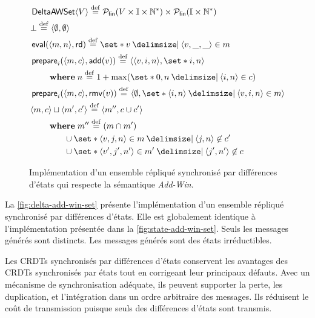 \begin{figure}[tb]
\centering
\begin{align*}
&\trm{DeltaAWSet}\tuple*{V} \defeq \powerfset{V \times \mathbb{I} \times \mathbb{N}^*} \times \powerfset{\mathbb{I} \times \mathbb{N}^*}\\
&\bot \defeq \tuple*{\emptyset, \emptyset}\\
&\trm{eval}(\tuple*{m, n}, \trm{rd}) \defeq \set*{v \given \tuple*{v, \_, \_} \in m}\\
&\begin{aligned}
\MoveEqLeft\trm{prepare}_i(\tuple*{m, c}, \trm{add}(v)) \defeq \tuple*{\tuple*{v, i, n},\set*{i, n}}\\
    &\where n \defeq 1 + \max(\set*{0,n \given \tuple*{i, n} \in c})
\end{aligned}\\
&\trm{prepare}_i(\tuple*{m, c}, \trm{rmv}(v)) \defeq \tuple*{\emptyset, \set*{\tuple*{i, n} \given \tuple*{v, i, n} \in m}}\\
&\begin{aligned}
\MoveEqLeft \tuple*{m, c} \sqcup \tuple*{m', c'} \defeq \tuple*{m'', c \cup c'}\\
    &\begin{aligned}
    \MoveEqLeft\where m'' \defeq (m \cap m')\\
    &\cup \set*{\tuple*{v, j, n} \in m \given \tuple*{j, n} \not\in c'}\\
    &\cup \set*{\tuple*{v', j', n'} \in m' \given \tuple*{j', n'} \not\in c}
    \end{aligned}
\end{aligned}
\end{align*}
\caption[Implémentation d'un ensemble répliqué synchronisé par différences d'états]{Implémentation d'un ensemble répliqué synchronisé par différences d'états qui respecte la sémantique \emph{Add-Win}.}\label{fig:delta-add-win-set}
\end{figure}

La \autoref{fig:delta-add-win-set} présente l'implémentation d'un ensemble répliqué synchronisé par différences d'états.
Elle est globalement identique à l'implémentation présentée dans la \autoref{fig:state-add-win-set}.
Seuls les messages générés sont distincts.
Les messages générés sont des états irréductibles.

Les \acp{CRDT} synchronisés par différences d'états conservent les avantages des \acp{CRDT} synchronisés par états tout en corrigeant leur principaux défauts.
Avec un mécanisme de synchronisation adéquate, ils peuvent supporter la perte, les duplication, et l'intégration dans un ordre arbitraire des messages.
Ils réduisent le coût de transmission puisque seuls des différences d'états sont transmis.

